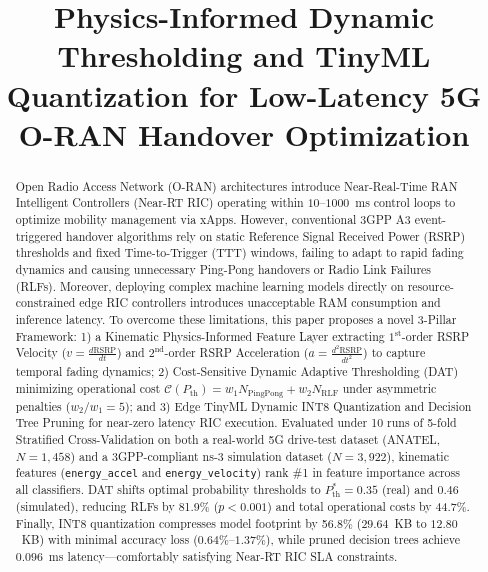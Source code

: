 \documentclass[conference]{IEEEtran}
\begin{document}
\title{Physics-Informed Dynamic Thresholding and TinyML Quantization for Low-Latency 5G O-RAN Handover Optimization\\
}

\author{
}

\maketitle

\begin{abstract}
Open Radio Access Network (O-RAN) architectures introduce Near-Real-Time RAN Intelligent Controllers (Near-RT RIC) operating within $10$--$1000$~ms control loops to optimize mobility management via xApps. However, conventional 3GPP A3 event-triggered handover algorithms rely on static Reference Signal Received Power (RSRP) thresholds and fixed Time-to-Trigger (TTT) windows, failing to adapt to rapid fading dynamics and causing unnecessary Ping-Pong handovers or Radio Link Failures (RLFs). Moreover, deploying complex machine learning models directly on resource-constrained edge RIC controllers introduces unacceptable RAM consumption and inference latency. To overcome these limitations, this paper proposes a novel 3-Pillar Framework: 1) a Kinematic Physics-Informed Feature Layer extracting $1^{\text{st}}$-order RSRP Velocity ($v = \frac{d\text{RSRP}}{dt}$) and $2^{\text{nd}}$-order RSRP Acceleration ($a = \frac{d^2\text{RSRP}}{dt^2}$) to capture temporal fading dynamics; 2) Cost-Sensitive Dynamic Adaptive Thresholding (DAT) minimizing operational cost $\mathcal{C}(P_{\text{th}}) = w_1 N_{\text{PingPong}} + w_2 N_{\text{RLF}}$ under asymmetric penalties ($w_2/w_1 = 5$); and 3) Edge TinyML Dynamic INT8 Quantization and Decision Tree Pruning for near-zero latency RIC execution. Evaluated under 10 runs of 5-fold Stratified Cross-Validation on both a real-world 5G drive-test dataset (ANATEL, $N=1,458$) and a 3GPP-compliant ns-3 simulation dataset ($N=3,922$), kinematic features (\texttt{energy\_accel} and \texttt{energy\_velocity}) rank \#1 in feature importance across all classifiers. DAT shifts optimal probability thresholds to $P_{\text{th}}^* = 0.35$ (real) and $0.46$ (simulated), reducing RLFs by 81.9\% ($p < 0.001$) and total operational costs by 44.7\%. Finally, INT8 quantization compresses model footprint by 56.8\% ($29.64$~KB to $12.80$~KB) with minimal accuracy loss ($0.64\%$--$1.37\%$), while pruned decision trees achieve $0.096$~ms latency—comfortably satisfying Near-RT RIC SLA constraints.
\end{abstract}
\end{document}
